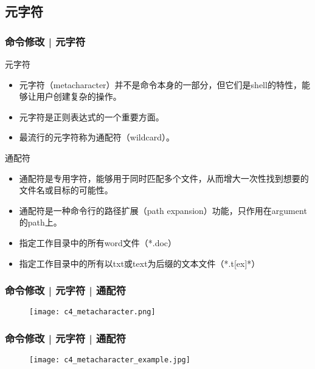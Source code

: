 \subsection{元字符}
\begin{frame}
  \frametitle{命令修改 | 元字符}
  \begin{block}{元字符}
    \begin{itemize}[<+->]
      \item 元字符（metacharacter）并不是命令本身的一部分，但它们是shell的特性，能够让用户创建复杂的操作。
      \item 元字符是正则表达式的一个重要方面。
      \item 最流行的元字符称为通配符（wildcard）。
    \end{itemize}
  \end{block}
  \pause
  \begin{block}{通配符}
    \begin{itemize}[<+->]
      \item 通配符是专用字符，能够用于同时匹配多个文件，从而增大一次性找到想要的文件名或目标的可能性。
      \item 通配符是一种命令行的路径扩展（path expansion）功能，只作用在argument的path上。
      \item 指定工作目录中的所有word文件（*.doc）
      \item 指定工作目录中的所有以txt或text为后缀的文本文件（*.t[ex]*）
    \end{itemize}
  \end{block}
\end{frame}

\begin{frame}
  \frametitle{命令修改 | 元字符 | \alert{通配符}}
  \begin{figure}
    \centering
    \texttt{[image: c4\_metacharacter.png]}
  \end{figure}
\end{frame}

\begin{frame}
  \frametitle{命令修改 | 元字符 | 通配符}
  \begin{figure}
    \centering
    \texttt{[image: c4\_metacharacter\_example.jpg]}
  \end{figure}
\end{frame}

